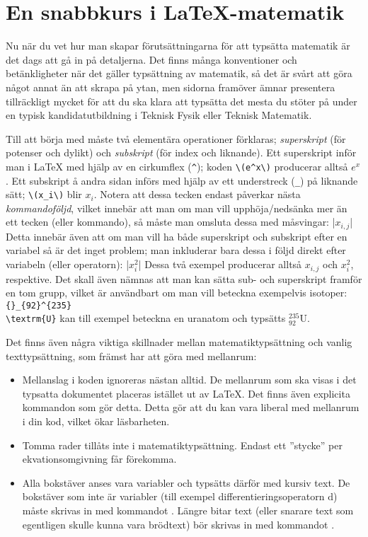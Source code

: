 \documentclass[10pt,../../a4.tex]{subfiles}
\begin{document}
\section{En snabbkurs i \LaTeX-matematik}
Nu när du vet hur man skapar förutsättningarna för att typsätta matematik
är det dags att gå in på detaljerna. Det finns många konventioner
och betänkligheter när det gäller typsättning av matematik, så det är
svårt att göra något annat än att skrapa på ytan, men sidorna framöver
ämnar presentera tillräckligt mycket för att du ska klara att typsätta
det mesta du stöter på under en typisk kandidatutbildning i Teknisk Fysik
eller Teknisk Matematik.

\label{sec:3:subscript}
Till att börja med måste två elementära operationer förklaras;
\emph{superskript} (för potenser och dylikt) och \emph{subskript} (för 
index och liknande). Ett superskript inför man i \LaTeX{} med hjälp av
en cirkumflex (\verb|^|); koden \verb|\(e^x\)| producerar alltså \(e^x\).
Ett subskript å andra sidan införs med hjälp av ett understreck (\verb|_|)
på liknande sätt; \verb|\(x_i\)| blir \(x_i\). Notera att dessa tecken
endast påverkar nästa \emph{kommandoföljd}, vilket innebär att man om man
vill upphöja/nedsänka mer än ett tecken (eller kommando), så måste man
omsluta dessa med måsvingar:
\latex|\(x_{i,j}\)|
Detta innebär även att om man vill ha både superskript och subskript efter
en variabel så är det inget problem; man inkluderar bara dessa i följd
direkt efter variabeln (eller operatorn):
\latex|\(x_i^2\)|
Dessa två exempel producerar alltså \(x_{i,j}\) och \(x_i^2\), 
respektive. Det skall även nämnas att man kan sätta sub- och superskript
framför en tom grupp, vilket är användbart om man vill beteckna exempelvis
isotoper: \verb|{}_{92}^{235}|\\\verb|\textrm{U}| kan till exempel beteckna en uranatom
och typsätts \({}_{92}^{235}\textrm{U}\).

Det finns även några viktiga skillnader mellan matematiktypsättning och
vanlig texttypsättning, som främst har att göra med mellanrum:
\begin{itemize}
	\item Mellanslag i koden ignoreras nästan alltid. De mellanrum som ska
	visas i det typsatta dokumentet placeras istället ut av \LaTeX. Det
	finns även explicita kommandon som gör detta. Detta gör att du kan
	vara liberal med mellanrum i din kod, vilket ökar läsbarheten.
	
	\item Tomma rader tillåts inte i matematiktypsättning. Endast ett
	”stycke” per ekvationsomgivning får förekomma.
	
	\item Alla bokstäver anses vara variabler och typsätts därför med
	kursiv text. De bokstäver som inte är variabler (till exempel
	differentieringsoperatorn \(\mathrm{d}\)) måste skrivas in med 
	kommandot . Längre bitar text (eller snarare text
	som egentligen skulle kunna vara brödtext)
	bör skrivas in med kommandot .
\end{itemize}
\end{document}
